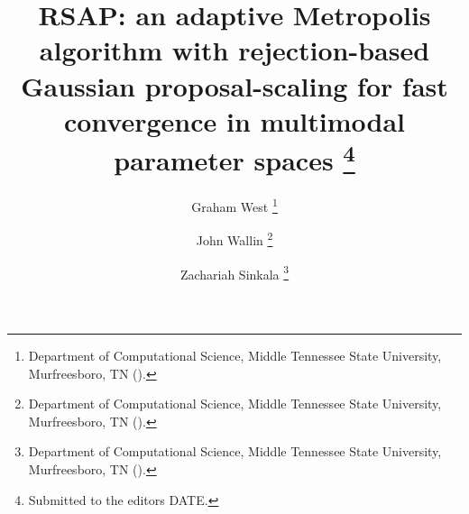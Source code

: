 

\usepackage[utf8]{inputenc}
\usepackage[english]{babel}
\usepackage{lipsum}
\usepackage{amsfonts}
\usepackage{graphicx}
\usepackage{epstopdf}
\usepackage{algorithmic}
\usepackage{textpos}
\usepackage{verbatim}
\usepackage{textcomp}
\usepackage{varwidth}


\newenvironment{tight_enum}{
\begin{enumerate}[label=\alph*.]
\setlength{\itemsep}{0pt}
\setlength{\parskip}{0pt}
}{\end{enumerate}}

\ifpdf
\else
\fi

\usepackage{enumitem}

\newcommand{\creflastconjunction}{, and~}



\title{RSAP: an adaptive Metropolis algorithm with rejection-based Gaussian proposal-scaling for fast convergence in multimodal parameter spaces \thanks{Submitted to the editors DATE.
}}

\author{Graham West \thanks{Department of Computational Science, Middle Tennessee State University, Murfreesboro, TN 
  ().}
\and John Wallin \thanks{Department of Computational Science, Middle Tennessee State University, Murfreesboro, TN ().}
\and Zachariah Sinkala \thanks{Department of Computational Science, Middle Tennessee State University, Murfreesboro, TN ().}
}

\usepackage{amsopn}
\DeclareMathOperator{\diag}{diag}


